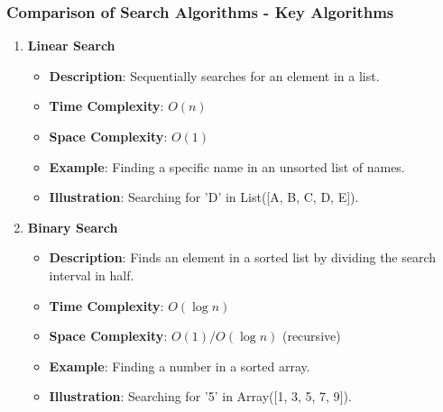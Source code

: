 \documentclass[aspectratio=169]{beamer}
\begin{document}
\begin{frame}[fragile]
    \frametitle{Comparison of Search Algorithms - Key Algorithms}
    \begin{enumerate}
        \item \textbf{Linear Search}
            \begin{itemize}
                \item \textbf{Description}: Sequentially searches for an element in a list.
                \item \textbf{Time Complexity}: $O(n)$
                \item \textbf{Space Complexity}: $O(1)$
                \item \textbf{Example}: Finding a specific name in an unsorted list of names.
                \item \textbf{Illustration}: Searching for 'D' in List([A, B, C, D, E]).
            \end{itemize}

        \item \textbf{Binary Search}
            \begin{itemize}
                \item \textbf{Description}: Finds an element in a sorted list by dividing the search interval in half.
                \item \textbf{Time Complexity}: $O(\log n)$
                \item \textbf{Space Complexity}: $O(1) / O(\log n)$ (recursive)
                \item \textbf{Example}: Finding a number in a sorted array.
                \item \textbf{Illustration}: Searching for '5' in Array([1, 3, 5, 7, 9]).
            \end{itemize}
    \end{enumerate}
\end{frame}
\end{document}
